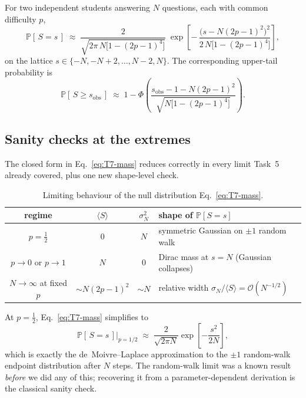 \documentclass[11pt,a4paper]{article}
\renewcommand{\Pr}{\mathbb{P}}
\begin{document}
\begin{keyresult}
For two independent students answering $N$ questions, each with
common difficulty $p$,
\begin{equation}
  \boxed{\;
  \Pr[\,S=s\,]
  \;\approx\;
  \frac{2}{\sqrt{2\pi\,N\bigl[1-(2p-1)^4\bigr]}}\;
  \exp\!\left[
    -\,\frac{\bigl(s - N(2p-1)^2\bigr)^2}
            {2\,N\bigl[1-(2p-1)^4\bigr]}
  \right],
  \;}
  \label{eq:T7-mass}
\end{equation}
on the lattice $s\in\{-N,-N+2,\ldots,N-2,N\}$. The corresponding
upper-tail probability is
\begin{equation}
  \boxed{\;
  \Pr[\,S \geq s_{\text{obs}}\,]
  \;\approx\;
  1 - \Phi\!\left(
    \frac{s_{\text{obs}} - 1 - N(2p-1)^2}
         {\sqrt{N\bigl[1-(2p-1)^4\bigr]}}
  \right).
  \;}
  \label{eq:T7-tail}
\end{equation}
\end{keyresult}

\subsection{Sanity checks at the extremes}
The closed form in Eq.~\eqref{eq:T7-mass} reduces correctly in every
limit Task~5 already covered, plus one new shape-level check.

\begin{table}[htb]
  \centering
  \begin{tabular}{c c c l}
    \toprule
    regime & $\langle S\rangle$ & $\sigma_N^2$ &
        shape of $\Pr[S=s]$ \\
    \midrule
    $p = \tfrac12$ & $0$ & $N$ &
        symmetric Gaussian on $\pm 1$ random walk \\
    $p\to 0$ or $p\to 1$ & $N$ & $0$ &
        Dirac mass at $s=N$ (Gaussian collapses) \\
    $N\to\infty$ at fixed $p$ & $\sim N(2p-1)^2$ & $\sim N$ &
        relative width $\sigma_N/\langle S\rangle = \mathcal{O}(N^{-1/2})$ \\
    \bottomrule
  \end{tabular}
  \caption{Limiting behaviour of the null distribution
  Eq.~\eqref{eq:T7-mass}.}
  \label{tab:T7-limits}
\end{table}

\begin{insight}
At $p=\tfrac12$, Eq.~\eqref{eq:T7-mass} simplifies to
\begin{equation}
  \Pr[\,S=s\,]\bigl|_{p=1/2}
  \;\approx\;
  \frac{2}{\sqrt{2\pi N}}\exp\!\left[-\frac{s^2}{2N}\right],
\end{equation}
which is exactly the de~Moivre--Laplace approximation to the
$\pm 1$ random-walk endpoint distribution after $N$ steps. The
random-walk limit was a known result \emph{before} we did any of
this; recovering it from a parameter-dependent derivation is the
classical sanity check.
\end{insight}
\end{document}
